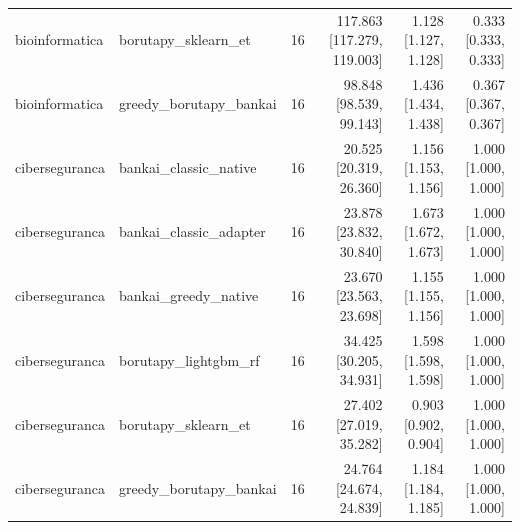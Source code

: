 \begin{tabular}{llrrrr}
bioinformatica & borutapy\_sklearn\_et & 16 & 117.863 [117.279, 119.003] & 1.128 [1.127, 1.128] & 0.333 [0.333, 0.333] \\
bioinformatica & greedy\_borutapy\_bankai & 16 & 98.848 [98.539, 99.143] & 1.436 [1.434, 1.438] & 0.367 [0.367, 0.367] \\
ciberseguranca & bankai\_classic\_native & 16 & 20.525 [20.319, 26.360] & 1.156 [1.153, 1.156] & 1.000 [1.000, 1.000] \\
ciberseguranca & bankai\_classic\_adapter & 16 & 23.878 [23.832, 30.840] & 1.673 [1.672, 1.673] & 1.000 [1.000, 1.000] \\
ciberseguranca & bankai\_greedy\_native & 16 & 23.670 [23.563, 23.698] & 1.155 [1.155, 1.156] & 1.000 [1.000, 1.000] \\
ciberseguranca & borutapy\_lightgbm\_rf & 16 & 34.425 [30.205, 34.931] & 1.598 [1.598, 1.598] & 1.000 [1.000, 1.000] \\
ciberseguranca & borutapy\_sklearn\_et & 16 & 27.402 [27.019, 35.282] & 0.903 [0.902, 0.904] & 1.000 [1.000, 1.000] \\
ciberseguranca & greedy\_borutapy\_bankai & 16 & 24.764 [24.674, 24.839] & 1.184 [1.184, 1.185] & 1.000 [1.000, 1.000] \\
\end{tabular}

